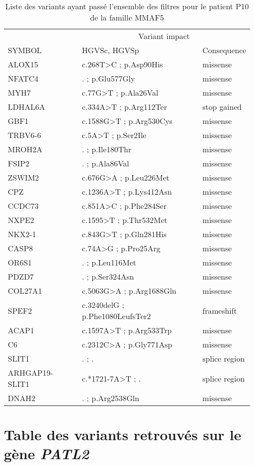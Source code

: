 \documentclass[12pt,twoside]{ugathesis}
\begin{document}
\begin{longtable}[t]{lll}
\caption{\label{tab:tabmmaf5}Liste des variants ayant passé l'ensemble des filtres pour le patient P10 de la famille MMAF5}\\
\toprule
\multicolumn{1}{c}{ } & \multicolumn{2}{c}{Variant impact} \\
\cmidrule(l{2pt}r{2pt}){2-3}
SYMBOL & HGVSc, HGVSp & Consequence\\
\midrule
ALOX15 & c.268T>C ; p.Asp90His & missense\\
NFATC4 & . ; p.Glu577Gly & missense\\
MYH7 & c.77G>T ; p.Ala26Val & missense\\
LDHAL6A & c.334A>T ; p.Arg112Ter & stop gained\\
GBF1 & c.1588G>T ; p.Arg530Cys & missense\\
\addlinespace
TRBV6-6 & c.5A>T ; p.Ser2Ile & missense\\
MROH2A & . ; p.Ile180Thr & missense\\
FSIP2 & . ; p.Ala86Val & missense\\
ZSWIM2 & c.676G>A ; p.Leu226Met & missense\\
CPZ & c.1236A>T ; p.Lys412Asn & missense\\
\addlinespace
CCDC73 & c.851A>C ; p.Phe284Ser & missense\\
NXPE2 & c.1595>T ; p.Thr532Met & missense\\
NKX2-1 & c.843G>T ; p.Gln281His & missense\\
CASP8 & c.74A>G ; p.Pro25Arg & missense\\
OR6S1 & . ; p.Leu116Met & missense\\
\addlinespace
PDZD7 & . ; p.Ser324Asn & missense\\
COL27A1 & c.5063G>A ; p.Arg1688Gln & missense\\
SPEF2 & c.3240delG ; p.Phe1080LeufsTer2 & frameshift\\
ACAP1 & c.1597A>T ; p.Arg533Trp & missense\\
C6 & c.2312C>A ; p.Gly771Asp & missense\\
\addlinespace
SLIT1 & . ; . & splice region\\
ARHGAP19-SLIT1 & c.*1721-7A>T ; . & splice region\\
DNAH2 & . ; p.Arg2538Gln & missense\\
\bottomrule
\end{longtable}

\chapter{\texorpdfstring{Table des variants retrouvés sur le gène
\emph{PATL2}}{Table des variants retrouvés sur le gène PATL2}}\label{table-des-variants-retrouves-sur-le-gene-patl2}
\end{document}

